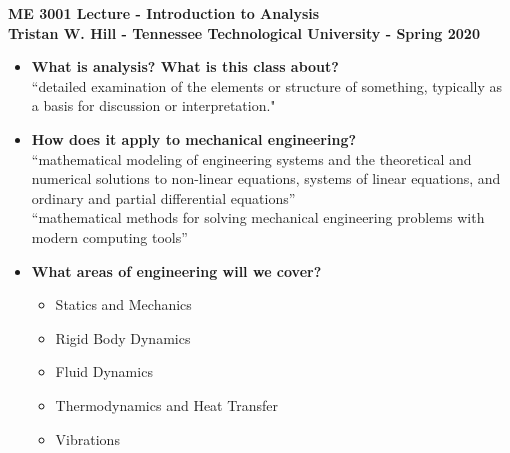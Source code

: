 \documentclass[11pt]{article}
\begin{document}
\textbf{ \LARGE ME 3001 Lecture - Introduction to Analysis} \vspace{3mm}\\
\textbf{ \hspace*{5mm}Tristan W. Hill - Tennessee Technological University - Spring 2020 } \vspace{3mm}\\

\begin{itemize}


	\item \textbf{ \LARGE What is analysis? What is this class about?}\\
			
			\Large{``detailed examination of the elements or structure of something, typically as a basis for discussion or interpretation."}  \vspace{10mm} \\ 



		\item \textbf{ \LARGE How does it apply to mechanical engineering?}\\

			\Large{``mathematical modeling of engineering systems and the theoretical and numerical solutions to non-linear equations, systems of linear equations, and ordinary and partial differential equations''}\\
			
			\Large{``mathematical methods for solving mechanical engineering problems with modern computing tools''} \vspace{5mm}\\

		\item \textbf{ \LARGE What areas of engineering will we cover?}\\
		
		\begin{itemize}
		
			\item Statics and Mechanics\\
			\item Rigid Body Dynamics\\
			\item Fluid Dynamics\\
			\item Thermodynamics and Heat Transfer\\
			\item Vibrations\\
		

\end{itemize}
\end{itemize}
\end{document}
